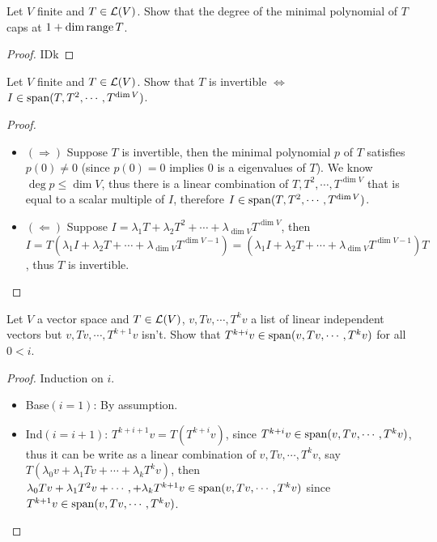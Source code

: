 \documentclass[../main.tex]{subfiles}
\begin{document}
\begin{exercise}
  Let $V$ finite and $T \in \mathcal{L}(V)$. Show that the degree of the minimal polynomial of $T$
  caps at $1 + \dim \operatorname{range} T$.
\end{exercise}
\begin{proof}
  IDk
\end{proof}

\begin{exercise}
  Let $V$ finite and $T \in \mathcal{L}(V)$.
  Show that $T$ is invertible $\iff$ $I \in \operatorname{span}(T, T^2, \cdots, T^{\dim V})$.
\end{exercise}
\begin{proof}
  ~
  \begin{itemize}
    \item $(\Rightarrow)$ Suppose $T$ is invertible, then the minimal polynomial $p$
          of $T$ satisfies $p(0) \neq 0$ (since $p(0) = 0$ implies $0$ is a eigenvalues of $T$).
          We know $\deg p \le \dim V$, thus there is a linear combination of $T, T^2, \cdots, T^{\dim V}$
          that is equal to a scalar multiple of $I$, therefore $I \in \operatorname{span}(T, T^2, \cdots, T^{\dim V})$.
    \item $(\Leftarrow)$ Suppose $I = \lambda_1 T + \lambda_2 T^2 + \cdots + \lambda_{\dim V} T^{\dim V}$,
          then $I = T(\lambda_1 I + \lambda_2 T + \cdots + \lambda_{\dim V}T^{\dim V - 1}) = (\lambda_1 I + \lambda_2 T + \cdots + \lambda_{\dim V}T^{\dim V - 1})T$,
          thus $T$ is invertible.
  \end{itemize}
\end{proof}


\begin{exercise*}
  Let $V$ a vector space and $T \in \mathcal{L}(V)$, $v, Tv, \cdots, T^kv$ a list of linear independent
  vectors but $v, Tv, \cdots, T^{k + 1}v$ isn't. Show that $T^{k + i}v \in \operatorname{span}(v, Tv, \cdots, T^kv)$ for all $0 < i$.
\end{exercise*}
\begin{proof}
  Induction on $i$.
  \begin{itemize}
    \item Base$(i = 1)$: By assumption.
    \item Ind$(i = i + 1)$: $T^{k + i + 1}v = T(T^{k + i}v)$, since $T^{k + i}v \in \operatorname{span}(v, Tv, \cdots, T^k v)$,
          thus it can be write as a linear combination of $v, Tv, \cdots, T^kv$,
          say $T(\lambda_0 v + \lambda_1 Tv + \cdots + \lambda_k T^kv)$,
          then $\lambda_0 Tv + \lambda_1 T^2v + \cdots, + \lambda_k T^{k + 1} v \in \operatorname{span}(v, Tv, \cdots, T^kv)$
          since $T^{k + 1} v \in \operatorname{span}(v, Tv, \cdots, T^k v)$.
  \end{itemize}
\end{proof}
\end{document}
